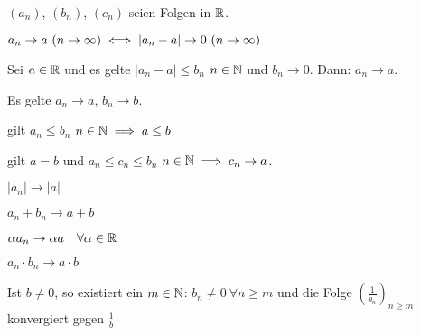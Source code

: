 \documentclass[a4paper,twoside,DIV15,BCOR12mm]{scrbook}
\begin{document}
\begin{satz}[Konvergenzsätze]
$(a_n)$, $(b_n)$, $(c_n)$ seien Folgen in $\mathbb{R}$.
\begin{liste}
\item $a_n \to a \ (n \to \infty) \iff |a_n - a| \to 0 \ (n \to \infty)$
\item Sei $a \in \mathbb{R}$ und es gelte $|a_n - a| \le b_n$ \ffa $n\in\mathbb{N}$ und $b_n \to 0$. Dann: $a_n \to a$.
\item Es gelte $a_n \to a$, $b_n \to b$.
\begin{liste}
\item gilt $a_n \le b_n$ \ffa $n\in\mathbb{N} \implies a \le b$
\item gilt $a=b$ und $a_n \le c_n \le b_n$ \ffa $n\in\mathbb{N} \implies c_n \to a$.
\item $|a_n| \to |a|$
\item $a_n + b_n \to a+b$
\item $\alpha a_n \to \alpha a\quad \forall\alpha \in \mathbb{R}$
\item $a_n \cdot b_n \to a\cdot b$
\item Ist $b \ne 0$, so existiert ein $m\in\mathbb{N}$: $b_n \ne 0\ \forall n\ge m$ und die Folge $(\frac{1}{b_n})_{n\ge m}$ konvergiert gegen $\frac{1}{b}$
\end{liste}
\end{liste}
\end{satz}
\end{document}
